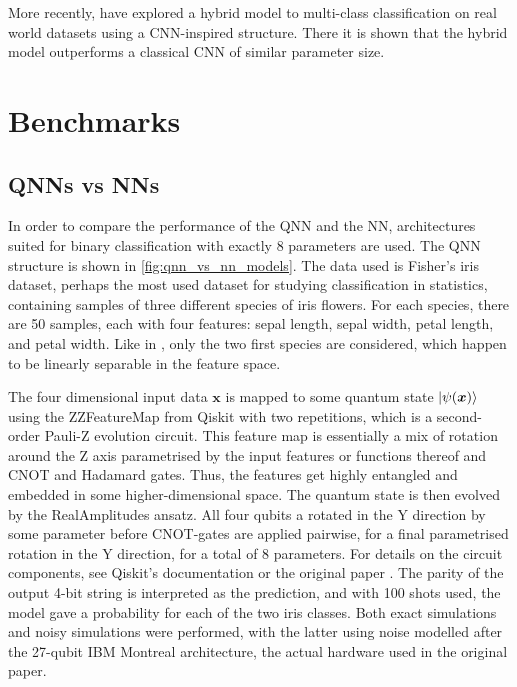 More recently, \textcite{zeng2022} have explored a hybrid model to multi-class classification on real world datasets using a CNN-inspired structure. There it is shown that the hybrid model outperforms a classical CNN of similar parameter size.

\section{Benchmarks}
\subsection{QNNs vs NNs}\label{sec:qnn-vs-nn}
In order to compare the performance of the QNN and the NN, architectures suited for binary classification with exactly 8 parameters are used. The QNN structure is shown in \cref{fig:qnn_vs_nn_models}. The data used is Fisher's iris dataset, perhaps the most used dataset for studying classification in statistics, containing samples of three different species of iris flowers. For each species, there are 50 samples, each with four features: sepal length, sepal width, petal length, and petal width. Like in \cite{abbas2021}, only the two first species are considered, which happen to be linearly separable in the feature space.

The four dimensional input data $\bm{x}$ is mapped to some quantum state $\ket{\psi(\bm{x})}$ using the ZZFeatureMap from Qiskit with two repetitions, which is a second-order Pauli-Z evolution circuit. This feature map is essentially a mix of rotation around the Z axis parametrised by the input features or functions thereof and CNOT and Hadamard gates. Thus, the features get highly entangled and embedded in some higher-dimensional space. The quantum state is then evolved by the RealAmplitudes ansatz. All four qubits a rotated in the Y direction by some parameter before CNOT-gates are applied pairwise, for a final parametrised rotation in the Y direction, for a total of 8 parameters. For details on the circuit components, see Qiskit's documentation \cite{qiskit} or the original paper \cite{abbas2021}. The parity of the output 4-bit string is interpreted as the prediction, and with 100 shots used, the model gave a probability for each of the two iris classes. Both exact simulations and noisy simulations were performed, with the latter using noise modelled after the 27-qubit IBM Montreal architecture, the actual hardware used in the original paper.

